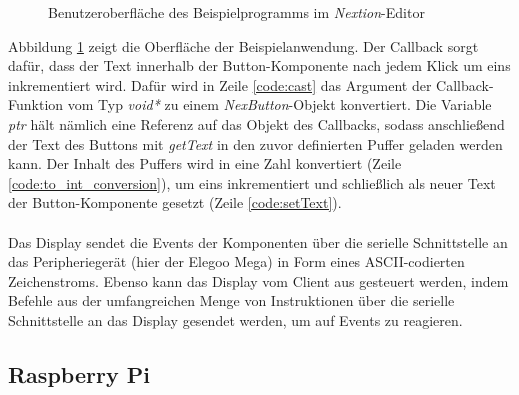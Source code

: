 \begin{figure}[H]
    \centering
    \caption{Benutzeroberfläche des Beispielprogramms im \textit{Nextion}-Editor}
    \label{img:nextion_example}
\end{figure}
\noindent
Abbildung \ref{img:nextion_example} zeigt die Oberfläche der Beispielanwendung. Der Callback sorgt dafür, dass der Text innerhalb der Button-Komponente nach jedem Klick um eins inkrementiert wird. Dafür wird in Zeile \ref{code:cast} das Argument der Callback-Funktion vom Typ \textit{void*} zu einem \textit{NexButton}-Objekt konvertiert. Die Variable \textit{ptr} hält nämlich eine Referenz auf das Objekt des Callbacks, sodass anschließend der Text des Buttons mit \textit{getText} in den zuvor definierten Puffer geladen werden kann. Der Inhalt des Puffers wird in eine Zahl konvertiert (Zeile \ref{code:to_int_conversion}), um eins inkrementiert und schließlich als neuer Text der Button-Komponente gesetzt (Zeile \ref{code:setText}).\\\\
Das Display sendet die Events der Komponenten über die serielle Schnittstelle an das Peripheriegerät (hier der Elegoo Mega) in Form eines ASCII-codierten Zeichenstroms. Ebenso kann das Display vom Client aus gesteuert werden, indem Befehle aus der umfangreichen Menge von Instruktionen über die serielle Schnittstelle an das Display gesendet werden, um auf Events zu reagieren.
\subsection{Raspberry Pi} \label{section:raspberry}
